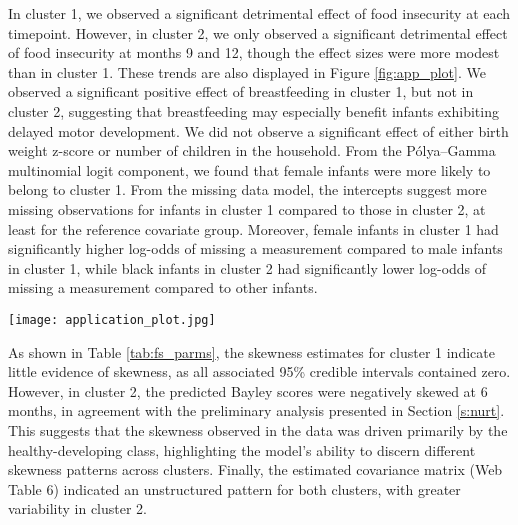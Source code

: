 \documentclass[useAMS,usenatbib,referee]{biom}
\let\origfigure\figure
\let\endorigfigure\endfigure
\renewenvironment{figure}[1][2] {
    \expandafter\origfigure\expandafter[H]
} {
    \endorigfigure
}
\begin{document}
In cluster 1, we observed a significant detrimental effect of food insecurity at each timepoint.  However, in cluster 2, we only observed a significant detrimental effect of food insecurity at months 9 and 12, though the effect sizes were more modest than in cluster 1. These trends are also displayed in Figure \ref{fig:app_plot}. We observed a significant positive effect of breastfeeding in cluster 1, but not in cluster 2, suggesting that breastfeeding may especially benefit infants exhibiting delayed motor development. We did not observe a significant effect of either birth weight z-score or number of children in the household. From the P\'olya--Gamma multinomial logit component, we found that female infants were more likely to belong to cluster 1. From the missing data model, the intercepts suggest more missing observations for infants in cluster 1 compared to those in cluster 2, at least for the reference covariate group. Moreover, female infants in cluster 1 had significantly higher log-odds of missing a measurement compared to male infants in cluster 1, while black infants in cluster 2 had significantly lower log-odds of missing a measurement compared to other infants.

\begin{figure}[h]
	\caption{\label{fig:app_plot}Predicted motor development trajectories for each cluster and food security group in the Nurture analysis. Estimated trajectories are given for a typical infant with a birth weight for gestational age z-score of 0, who was not breastfed, and who had 2.5 other children in the household. Solid lines indicate Cluster 1 and dashed lines indicate Cluster 2. Light shading represents food-secure infants, while dark shading represents food-insecure infants.}
	\texttt{[image: application\_plot.jpg]}
\end{figure}

As shown in Table \ref{tab:fs_parms}, the skewness estimates for cluster 1 indicate little evidence of skewness, as all associated 95\% credible intervals contained zero. However, in cluster 2, the predicted Bayley scores were negatively skewed at 6 months, in agreement with the preliminary analysis presented in Section \ref{s:nurt}. This suggests that the skewness observed in the data was driven primarily by the healthy-developing class, highlighting the model's ability to discern different skewness patterns across clusters. Finally, the estimated covariance matrix (Web Table 6) indicated an unstructured pattern for both clusters, with greater variability in cluster 2.
\end{document}
